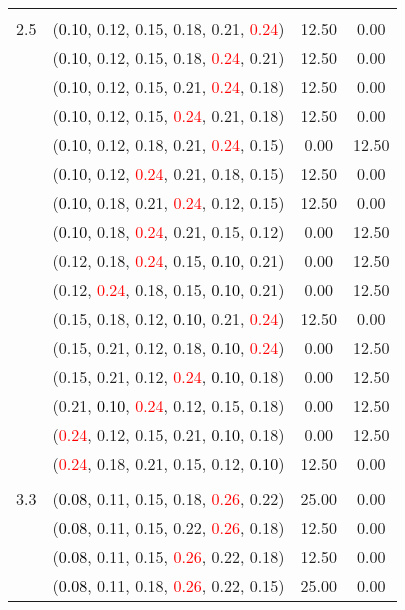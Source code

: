 \documentclass[10pt,a4paper]{report}
\begin{document}
\begin{center}
\begin{longtable}{clcc}
		&&&\\
		2.5			&(\textcolor{black}{0.10}, 0.12, 0.15, 0.18, 0.21, \textcolor{red}{0.24})&12.50&0.00\\
			&(\textcolor{black}{0.10}, 0.12, 0.15, 0.18, \textcolor{red}{0.24}, 0.21)&12.50&0.00\\
			&(\textcolor{black}{0.10}, 0.12, 0.15, 0.21, \textcolor{red}{0.24}, 0.18)&12.50&0.00\\
			&(\textcolor{black}{0.10}, 0.12, 0.15, \textcolor{red}{0.24}, 0.21, 0.18)&12.50&0.00\\
			&(\textcolor{black}{0.10}, 0.12, 0.18, 0.21, \textcolor{red}{0.24}, 0.15)&0.00&12.50\\
			&(\textcolor{black}{0.10}, 0.12, \textcolor{red}{0.24}, 0.21, 0.18, 0.15)&12.50&0.00\\
			&(\textcolor{black}{0.10}, 0.18, 0.21, \textcolor{red}{0.24}, 0.12, 0.15)&12.50&0.00\\
			&(\textcolor{black}{0.10}, 0.18, \textcolor{red}{0.24}, 0.21, 0.15, 0.12)&0.00&12.50\\
			&(0.12, 0.18, \textcolor{red}{0.24}, 0.15, \textcolor{black}{0.10}, 0.21)&0.00&12.50\\
			&(0.12, \textcolor{red}{0.24}, 0.18, 0.15, \textcolor{black}{0.10}, 0.21)&0.00&12.50\\
			&(0.15, 0.18, 0.12, \textcolor{black}{0.10}, 0.21, \textcolor{red}{0.24})&12.50&0.00\\
			&(0.15, 0.21, 0.12, 0.18, \textcolor{black}{0.10}, \textcolor{red}{0.24})&0.00&12.50\\
			&(0.15, 0.21, 0.12, \textcolor{red}{0.24}, \textcolor{black}{0.10}, 0.18)&0.00&12.50\\
			&(0.21, \textcolor{black}{0.10}, \textcolor{red}{0.24}, 0.12, 0.15, 0.18)&0.00&12.50\\
			&(\textcolor{red}{0.24}, 0.12, 0.15, 0.21, \textcolor{black}{0.10}, 0.18)&0.00&12.50\\
			&(\textcolor{red}{0.24}, 0.18, 0.21, 0.15, 0.12, \textcolor{black}{0.10})&12.50&0.00\\
		&&&\\
		3.3			&(\textcolor{black}{0.08}, 0.11, 0.15, 0.18, \textcolor{red}{0.26}, 0.22)&25.00&0.00\\
			&(\textcolor{black}{0.08}, 0.11, 0.15, 0.22, \textcolor{red}{0.26}, 0.18)&12.50&0.00\\
			&(\textcolor{black}{0.08}, 0.11, 0.15, \textcolor{red}{0.26}, 0.22, 0.18)&12.50&0.00\\
			&(\textcolor{black}{0.08}, 0.11, 0.18, \textcolor{red}{0.26}, 0.22, 0.15)&25.00&0.00\\

\end{longtable}
\end{center}
\end{document}
